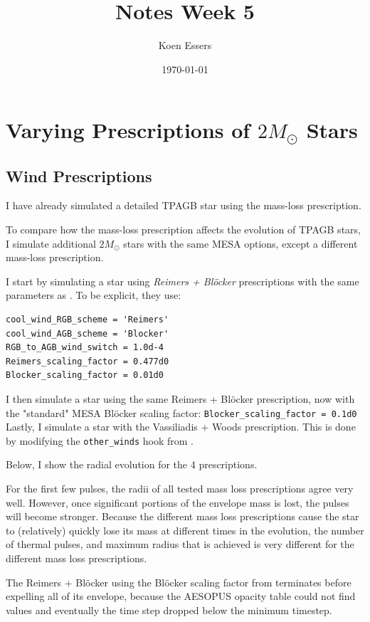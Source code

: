 \documentclass[a4paper,10pt]{article}
\title{Notes Week 5}
\author{Koen Essers}
\date{\today}
\begin{document}
\setuplayout
\section{Varying Prescriptions of \texorpdfstring{$2 M_\odot $}{2 solar mass} Stars}
\subsection{Wind Prescriptions}
I have already simulated a detailed TPAGB star using the \citet{trabucchi2018} mass-loss prescription.

To compare how the mass-loss prescription affects the evolution of TPAGB stars, I simulate additional \(2M_\odot \) stars with the same MESA options, except a different mass-loss prescription.

I start by simulating a star using \emph{Reimers + Bl\"ocker} prescriptions with the same parameters as \citet{cinquegrana2022}.
To be explicit, they use:
\begin{verbatim}
cool_wind_RGB_scheme = 'Reimers'
cool_wind_AGB_scheme = 'Blocker'
RGB_to_AGB_wind_switch = 1.0d-4
Reimers_scaling_factor = 0.477d0
Blocker_scaling_factor = 0.01d0 
\end{verbatim}
I then simulate a star using the same Reimers + Bl\"ocker prescription, now with the "standard" MESA Bl\"ocker scaling factor:
\texttt{Blocker_scaling_factor = 0.1d0}
Lastly, I simulate a star with the Vassiliadis + Woods prescription.
This is done by modifying the \lstinline[style=output, breaklines=true]|other_winds| hook from \citet{rees2024b}.

Below, I show the radial evolution for the 4 prescriptions.

\begin{figure}[ht]
    \centering
\end{figure}

For the first few pulses, the radii of all tested mass loss prescriptions agree very well. However, once significant portions of the envelope mass is lost, the pulses will become stronger. Because the different mass loss prescriptions cause the star to (relatively) quickly lose its mass at different times in the evolution, the number of thermal pulses, and maximum radius that is achieved is very different for the different mass loss prescriptions. 

The Reimers + Blöcker using the Blöcker scaling factor from \citet{cinquegrana2022} terminates before expelling all of its envelope, because the AESOPUS opacity table \citet{cinquegrana2022} could not find values and eventually the time step dropped below the minimum timestep.
\end{document}
